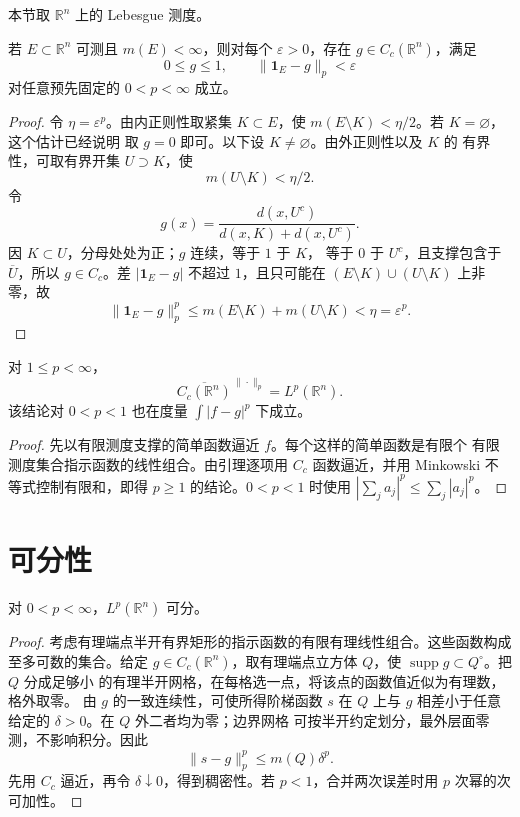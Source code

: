 本节取 \(\mathbb R^n\) 上的 Lebesgue 测度。

\begin{lemma}
\label{lem:indicator-compact-open-approx}
若 \(E\subset\mathbb R^n\) 可测且 \(m(E)<\infty\)，则对每个
\(\varepsilon>0\)，存在 \(g\in C_c(\mathbb R^n)\)，满足
\[
 0\le g\le1,\qquad
 \|\mathbf1_E-g\|_p<\varepsilon
\]
对任意预先固定的 \(0<p<\infty\) 成立。
\end{lemma}

\begin{proof}
令 \(\eta=\varepsilon^p\)。由内正则性取紧集 \(K\subset E\)，使
\(m(E\setminus K)<\eta/2\)。若 \(K=\varnothing\)，这个估计已经说明
取 \(g=0\) 即可。以下设 \(K\ne\varnothing\)。由外正则性以及 \(K\) 的
有界性，可取有界开集 \(U\supset K\)，使
\[
 m(U\setminus K)<\eta/2.
\]
令
\[
 g(x)=\frac{d(x,U^c)}{d(x,K)+d(x,U^c)}.
\]
因 \(K\subset U\)，分母处处为正；\(g\) 连续，等于 \(1\) 于 \(K\)，
等于 \(0\) 于 \(U^c\)，且支撑包含于 \(\overline U\)，所以
\(g\in C_c\)。差 \(|\mathbf1_E-g|\) 不超过 \(1\)，且只可能在
\((E\setminus K)\cup(U\setminus K)\) 上非零，故
\[
 \|\mathbf1_E-g\|_p^p
 \le m(E\setminus K)+m(U\setminus K)<\eta=\varepsilon^p.
\]
\end{proof}

\begin{theorem}
\label{thm:cc-dense-lp}
对 \(1\le p<\infty\)，
\[
 \overline{C_c(\mathbb R^n)}^{\,\|\cdot\|_p}
 =L^p(\mathbb R^n).
\]
该结论对 \(0<p<1\) 也在度量
\(\int|f-g|^p\) 下成立。
\end{theorem}

\begin{proof}
先以有限测度支撑的简单函数逼近 \(f\)。每个这样的简单函数是有限个
有限测度集合指示函数的线性组合。由引理逐项用 \(C_c\) 函数逼近，并用
Minkowski 不等式控制有限和，即得 \(p\ge1\) 的结论。\(0<p<1\) 时使用
\(|\sum_ja_j|^p\le\sum_j|a_j|^p\)。
\end{proof}

\section{可分性}

\begin{theorem}
\label{thm:lp-separable}
对 \(0<p<\infty\)，\(L^p(\mathbb R^n)\) 可分。
\end{theorem}

\begin{proof}
考虑有理端点半开有界矩形的指示函数的有限有理线性组合。这些函数构成
至多可数的集合。给定 \(g\in C_c(\mathbb R^n)\)，取有理端点立方体
\(Q\)，使 \(\operatorname{supp}g\subset Q^\circ\)。把 \(Q\) 分成足够小
的有理半开网格，在每格选一点，将该点的函数值近似为有理数，格外取零。
由 \(g\) 的一致连续性，可使所得阶梯函数 \(s\) 在 \(Q\) 上与 \(g\)
相差小于任意给定的 \(\delta>0\)。在 \(Q\) 外二者均为零；边界网格
可按半开约定划分，最外层面零测，不影响积分。因此
\[
 \|s-g\|_p^p\le m(Q)\delta^p.
\]
先用 \(C_c\) 逼近，再令 \(\delta\downarrow0\)，得到稠密性。若
\(p<1\)，合并两次误差时用 \(p\) 次幂的次可加性。
\end{proof}

